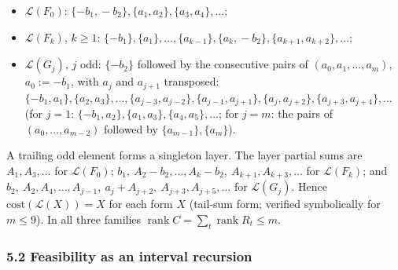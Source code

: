 \documentclass[
  11pt,
  a4paper,
]{article}
\providecommand{\tightlist}{%
  \setlength{\itemsep}{0pt}\setlength{\parskip}{0pt}}
\begin{document}
\begin{itemize}
\tightlist
\item
  \(\mathcal L(F_0)\): \(\{-b_1,\allowbreak{}-b_2\},\allowbreak{}\{a_1,\allowbreak{}a_2\},\allowbreak{}\{a_3,\allowbreak{}a_4\},\allowbreak{}\dots\);
\item
  \(\mathcal L(F_k)\), \(k\ge1\):
  \(\{-b_1\},\allowbreak{}\{a_1\},\allowbreak{}\dots,\allowbreak{}\{a_{k-1}\},\allowbreak{}\{a_k,\allowbreak{}-b_2\},\allowbreak{}\{a_{k+1},\allowbreak{}a_{k+2}\},\allowbreak{}\dots\);
\item
  \(\mathcal L(G_j)\), \(j\) odd: \(\{-b_2\}\) followed by the
  consecutive pairs of \((a_0,\allowbreak{}a_1,\allowbreak{}\dots,\allowbreak{}a_m)\), \(a_0:=-b_1\), with
  \(a_j\) and \(a_{j+1}\) transposed:
  \(\{-b_1,\allowbreak{}a_1\},\allowbreak{}\{a_2,\allowbreak{}a_3\},\allowbreak{}\dots,\allowbreak{}\{a_{j-3},\allowbreak{}a_{j-2}\},\allowbreak{}\{a_{j-1},\allowbreak{}a_{j+1}\},\allowbreak{}\{a_j,\allowbreak{}a_{j+2}\},\allowbreak{}\{a_{j+3},\allowbreak{}a_{j+4}\},\allowbreak{}\dots\)
  (for \(j=1\): \(\{-b_1,\allowbreak{}a_2\},\allowbreak{}\{a_1,\allowbreak{}a_3\},\allowbreak{}\{a_4,\allowbreak{}a_5\},\allowbreak{}\dots\); for
  \(j=m\): the pairs of \((a_0,\allowbreak{}\dots,\allowbreak{}a_{m-2})\) followed by
  \(\{a_{m-1}\},\allowbreak{}\{a_m\}\)).
\end{itemize}

A trailing odd element forms a singleton layer. The layer partial sums
are \(A_1,\allowbreak{}A_3,\allowbreak{}\dots\) for \(\mathcal L(F_0)\);
\(b_1,\allowbreak{}\ A_2-b_2,\allowbreak{}\dots,\allowbreak{}A_k-b_2,\allowbreak{}\ A_{k+1},\allowbreak{}A_{k+3},\allowbreak{}\dots\) for
\(\mathcal L(F_k)\); and
\(b_2,\allowbreak{}\ A_2,\allowbreak{}A_4,\allowbreak{}\dots,\allowbreak{}A_{j-1},\allowbreak{}\ a_j+A_{j+2},\allowbreak{}\ A_{j+3},\allowbreak{}A_{j+5},\allowbreak{}\dots\)
for \(\mathcal L(G_j)\). Hence \(\mathrm{cost}(\mathcal L(X))=X\) for
each form \(X\) (tail-sum form; verified symbolically for \(m\le9\)). In
all three families
\(\operatorname{rank}C=\sum_t\operatorname{rank}R_t\le m\).

\subsubsection{5.2 Feasibility as an interval
recursion}\label{feasibility-as-an-interval-recursion}
\end{document}
